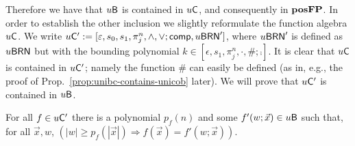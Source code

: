 \documentclass{lmcs}
\begin{document}
Therefore we have that $u \mathsf{B}$ is contained in $u \mathsf{C}$, and consequently in $\mathbf{pos}\mathbf{FP}$. In order to establish the other inclusion we slightly reformulate the function algebra $u \mathsf{C}$.
We write
$u \mathsf{C}' := [\varepsilon , s_0 , s_1 , \pi^n_j , \wedge , \vee ; \mathsf{comp} , u\mathsf{BRN}' ]$, where $u\mathsf{BRN}'$ is defined as $u\mathsf{BRN}$ but with the bounding polynomial $k\in [\epsilon , s_1 , \pi^{n}_j , \cdot , \# ; \comp ]$.
%
It is clear that $u \mathsf{C}$ is contained in $u \mathsf{C}'$; namely the function $\#$ can easily be defined (as in, e.g., the proof of Prop.~\ref{prop:unibc-contains-unicob} later). We will prove that $u \mathsf{C}'$ is contained in $u \mathsf{B}$.

\begin{lemma}
	\label{lem:safe-normal-bounding}
	For all $f\in u \mathsf{C}'$ there is a polynomial $p_f(n)$ and some $f' (w;\vec x)\in u \mathsf{B}$ such that, for all $\vec x , w$, $ (|w|\geq p_f (|\vec x|) \Rightarrow f(\vec x)=f'(w;\vec x))$.
\end{lemma}
\end{document}

